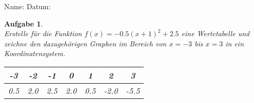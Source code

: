 \documentclass[12pt]{article}
\theoremstyle{note}
\newtheorem{aufgabe}{Aufgabe}
\begin{document}
 
    \begin{flushleft}
Name: \hspace{12cm} Datum:\begin{aufgabe} ~ \\ 
Erstelle f\"ur die Funktion $f(x)=- 0.5 \left(x + 1\right)^{2} + 2.5$ eine Wertetabelle und zeichne den dazugeh\"origen Graphen im Bereich von $x=-3$ bis $x=3$ in ein Koordinatensystem. \\ 
\renewcommand{\arraystretch}{1.0} 
\begin{tabular}{c|c|c|c|c|c|c}
-3 & -2 & -1 & 0 & 1 & 2 & 3\\ \hline 
0.5 & 2.0 & 2.5 & 2.0 & 0.5 & -2.0 & -5.5\\ 

\end{tabular} 


\end{aufgabe}
\end{flushleft}
\end{document}
